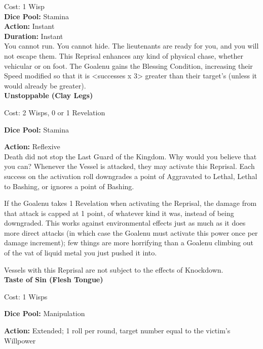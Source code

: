 \noindent Cost: 1 Wisp\\

\noindent\textbf{Dice Pool:} Stamina\\

\noindent\textbf{Action:} Instant\\

\noindent\textbf{Duration:} Instant\\

\noindent You cannot run. You cannot hide. The lieutenants are ready for you, and you will not escape them. This Reprisal enhances any kind of physical chase, whether vehicular or on foot. The Goalenu gains the Blessing Condition, increasing their Speed modified so that it is <successes x 3> greater than their target's (unless it would already be greater).\\

\noindent\textbf{Unstoppable (Clay Legs)}

\noindent Cost: 2 Wisps, 0 or 1 Revelation

\noindent\textbf{Dice Pool:} Stamina

\noindent\textbf{Action:} Reflexive\\

\noindent Death did not stop the Last Guard of the Kingdom. Why would you believe that you can? Whenever the Vessel is attacked, they may activate this Reprisal. Each success on the activation roll downgrades a point of Aggravated to Lethal, Lethal to Bashing, or ignores a point of Bashing.

If the Goalenu takes 1 Revelation when activating the Reprisal, the damage from that attack is capped at 1 point, of whatever kind it was, instead of being downgraded. This works against environmental effects just as much as it does more direct attacks (in which case the Goalenu must activate this power once per damage increment); few things are more horrifying than a Goalenu climbing out of the vat of liquid metal you just pushed it into.

Vessels with this Reprisal are not subject to the effects of Knockdown.\\

\noindent\textbf{Taste of Sin (Flesh Tongue)}

\noindent Cost: 1 Wisps

\noindent\textbf{Dice Pool:} Manipulation

\noindent\textbf{Action:} Extended; 1 roll per round, target number equal to the victim's Willpower\\

